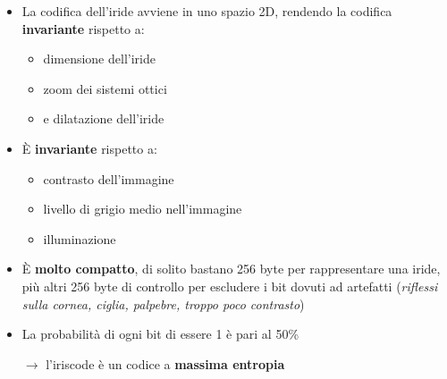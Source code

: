 \begin{itemize}
    \item La codifica dell'iride avviene in uno spazio 2D, rendendo la codifica \textbf{invariante}
    rispetto a:
    \begin{itemize}
        \item dimensione dell'iride
        \item zoom dei sistemi ottici
        \item e dilatazione dell'iride
    \end{itemize}
    \item È \textbf{invariante} rispetto a:
    \begin{itemize}
        \item contrasto dell'immagine 
        \item livello di grigio medio nell'immagine 
        \item illuminazione
    \end{itemize}
    \item È \textbf{molto compatto}, di solito bastano 256 byte per rappresentare una iride, più altri 
    256 byte di controllo per escludere i bit dovuti ad artefatti (\textit{riflessi sulla cornea, ciglia, palpebre, troppo poco contrasto})
    \item La probabilità di ogni bit di essere 1 è pari al 50\%
    
    $\rightarrow$ l'iriscode è un codice a \textbf{massima entropia}
\end{itemize}








